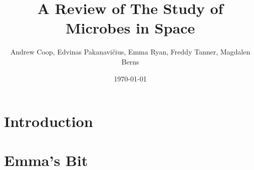\documentclass[12pt]{article}
\title{A Review of The Study of Microbes in Space}
\author{Andrew Coop, Edvinas Pakanavičius, Emma Ryan, Freddy Tanner, Magdalen Berns}
\date{\today}
\begin{document}
\maketitle
\thispagestyle{empty}

\begin{abstract}
\noindent

\end{abstract}

\clearpage
\tableofcontents
\thispagestyle{empty}
\clearpage

\section{Introduction}
\section{Emma's Bit}
\end{document}
